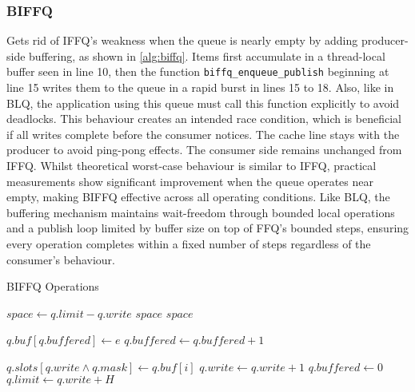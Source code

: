 \subsubsection{\acf{BIFFQ}}
Gets rid of \ac{IFFQ}'s weakness when the queue is nearly empty by adding producer-side buffering, as shown in \cref{alg:biffq}. Items first accumulate in a thread-local buffer seen in line 10, then the function \texttt{biffq\_enqueue\_publish} beginning at line 15 writes them to the queue in a rapid burst in lines 15 to 18. Also, like in \ac{BLQ}, the application using this queue must call this function explicitly to avoid deadlocks. This behaviour creates an intended race condition, which is beneficial if all writes complete before the consumer notices. The cache line stays with the producer to avoid ping-pong effects. The consumer side remains unchanged from \ac{IFFQ}. Whilst theoretical worst-case behaviour is similar to \ac{IFFQ}, practical measurements show significant improvement when the queue operates near empty, making \ac{BIFFQ} effective across all operating conditions. Like \ac{BLQ}, the buffering mechanism maintains wait-freedom through bounded local operations and a publish loop limited by buffer size on top of \ac{FFQ}'s bounded steps, ensuring every operation completes within a fixed number of steps regardless of the consumer's behaviour. \cite{MaffioneCacheAware}

\begin{algorithm}[!ht]
    \centering
    \captionsetup{justification=centering}
    \caption{\ac{BIFFQ} Operations \cite{MaffioneCacheAware}}
    \label{alg:biffq}
    \scriptsize
    \begin{algorithmic}[1]
            \State $space \gets q.limit - q.write$
                \State \Return $space$ 
            \EndIf
            \State \Return $space$
        \EndFunction
        
        \State
        
            \State $q.buf[q.buffered] \gets e$ 
            \State $q.buffered \gets q.buffered + 1$
        \EndFunction
        
        \State
        
                \State $q.slots[q.write \land q.mask] \gets q.buf[i]$ 
                \State $q.write \gets q.write + 1$
            \EndFor
            \State $q.buffered \gets 0$
            \State $q.limit \gets q.write + H$ 
        \EndFunction
    \end{algorithmic}
\end{algorithm}

